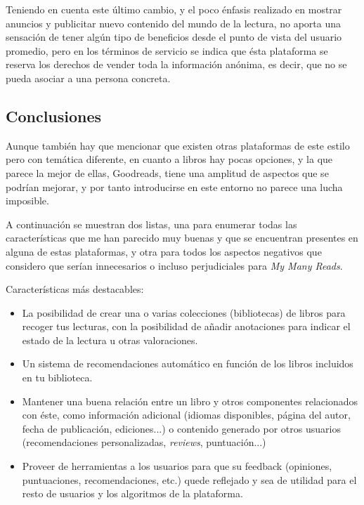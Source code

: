 Teniendo en cuenta este último cambio, y el poco énfasis realizado en mostrar anuncios y publicitar nuevo contenido del mundo de la lectura, no aporta una sensación de tener algún tipo de beneficios desde el punto de vista del usuario promedio, pero en los términos de servicio se indica que ésta plataforma se reserva los derechos de vender toda la información anónima, es decir, que no se pueda asociar a una persona concreta.
 
\subsection{Conclusiones}

Aunque también hay que mencionar que existen otras plataformas de este estilo pero con temática diferente, en cuanto a libros hay pocas opciones, y la que parece la mejor de ellas, Goodreads, tiene una amplitud de aspectos que se podrían mejorar, y por tanto introducirse en este entorno no parece una lucha imposible.

A continuación se muestran dos listas, una para enumerar todas las características que me han parecido muy buenas y que se encuentran presentes en alguna de estas plataformas, y otra para todos los aspectos negativos que considero que serían innecesarios o incluso perjudiciales para \textit{My Many Reads}.

Características más destacables:

\begin{itemize}
\item La posibilidad de crear una o varias colecciones (bibliotecas) de libros para recoger tus lecturas, con la posibilidad de añadir anotaciones para indicar el estado de la lectura u otras valoraciones.
\item Un sistema de recomendaciones automático en función de los libros incluidos en tu biblioteca.
\item Mantener una buena relación entre un libro y otros componentes relacionados con éste, como información adicional (idiomas disponibles, página del autor, fecha de publicación, ediciones...) o contenido generado por otros usuarios (recomendaciones personalizadas, \textit{reviews}, puntuación...)
\item Proveer de herramientas a los usuarios para que su feedback (opiniones, puntuaciones, recomendaciones, etc.) quede reflejado y sea de utilidad para el resto de usuarios y los algoritmos de la plataforma.
\end{itemize}

